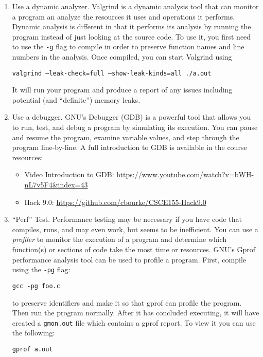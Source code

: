 \documentclass[12pt]{scrartcl}
\begin{document}
\begin{enumerate}
\begin{itemize}
  \end{itemize}
  
  \item Use a dynamic analyzer.  Valgrind is a dynamic analysis tool 
  that can monitor a program an analyze the resources it uses and
  operations it performs.  Dynamic analysis is different in that it
  performs its analysis by running the program instead of just looking
  at the source code.  To use it, you first need to use the 
  \texttt{-g} flag to compile in order to preserve function
  names and line numbers in the analysis.  Once compiled, you can start
  Valgrind using
  
  \texttt{valgrind --leak-check=full --show-leak-kinds=all ./a.out}

  It will run your program and produce a report of any issues including
  potential (and ``definite'') memory leaks.

  \item Use a debugger.  GNU's Debugger (GDB) is a powerful tool that
  allows you to run, test, and debug a program by simulating its execution.
  You can pause and resume the program, examine variable values, and
  step through the program line-by-line.  A full introduction to GDB
  is available in the course resources:
  \begin{itemize}
    \item Video Introduction to GDB: \url{https://www.youtube.com/watch?v=bWH-nL7v5F4&index=43}
    \item Hack 9.0: \url{https://github.com/cbourke/CSCE155-Hack9.0}
  \end{itemize}
  
  \item ``Perf'' Test.  Performance testing may be necessary if you have 
  code that compiles, runs, and may even work, but seems to be inefficient.
  You can use a \emph{profiler} to monitor the execution of a program
  and determine which function(s) or sections of code take the most time
  or resources.  GNU's Gprof performance analysis tool can be used to
  profile a program.  First, compile using the \texttt{-pg} flag:
  
  \texttt{gcc -pg foo.c}
  
  to preserve identifiers and make it so that gprof can profile the 
  program.  Then run the program normally.  After it has concluded 
  executing, it will have created a \texttt{gmon.out} file
  which contains a gprof report.  To view it you can use the following:
  
  \texttt{gprof a.out}
  
  
\end{enumerate}
\end{document}

